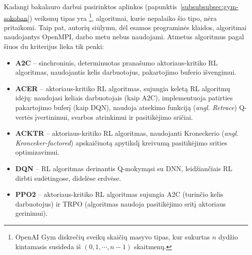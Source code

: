 \documentclass{VUMIFPSbakalaurinis}
\begin{document}
{\begin{table}[H]
\begin{tabular}{p{2cm}P{1cm}P{1cm}P{1cm}P{1cm}P{1cm}P{1cm}P{1cm}P{1cm}P{1.5cm}}
			\bottomrule
		\end{tabular}
	\end{table}
	Kadangi bakalauro darbui pasirinktos aplinkos (papunktis~\ref{subsubsubsec:gym-sokoban}) veiksmų tipas yra \footnote{OpenAI Gym diskrečių sveikų skaičių masyvo tipas, kur sukurtas \(n\) dydžio kintamasis susideda iš \((0, 1, \cdots, n-1)\) skaitmenų.}, algoritmai, kurie nepalaiko šio tipo, nėra pritaikomi. Taip pat, autorių siūlymu, dėl esamos programinės klaidos, algoritmai naudojantys OpenMPI, darbo metu nebus naudojami. Atmetus algoritmus pagal šiuos du kriterijus lieka tik penki:
	\begin{itemize}
		\item \textbf{A2C} \cite{a3c} -- sinchroninis, determinuotas pranašumo aktoriaus-kritiko RL algoritmas, naudojantis kelis darbuotojus, pakartojimo buferio išvengimui.
		\item \textbf{ACER} \cite{acer} -- aktoriaus-kritiko RL algoritmas, sujungia keletą RL algoritmų idėjų: naudojasi keliais darbuotojais (kaip A2C), implementuoja patirties pakartojimo buferį (kaip DQN), naudoja atsekimo funkciją (\textit{angl. Retrace}) Q-vertės įvertinimui, svarbos atrinkimui ir pasitikėjimo sričiai.
		\item \textbf{ACKTR} \cite{acktr} -- aktoriaus-kritiko RL algoritmas, naudojanti Kroneckerio (\textit{angl. Kronceker-factored}) apskaičiuotą apytikslį kreivumą pasitikėjimo srities optimizavimui.
		\item \textbf{DQN} \cite{dqn} -- RL algoritmas derinantis Q-mokymąsi su DNN, leidžiančiais RL dirbti sudėtingose, didelėse erdvėse.
		\item \textbf{PPO2} \cite{ppo} -- aktoriaus-kritiko RL algoritmas sujungia A2C (turinčio kelis darbuotojus) ir TRPO (algoritmas naudoja pasitikėjimo sritį aktoriaus gerinimui).
	\end{itemize}
}
\label{subsubsubsec:stable-baselines_framework}
\end{document}
